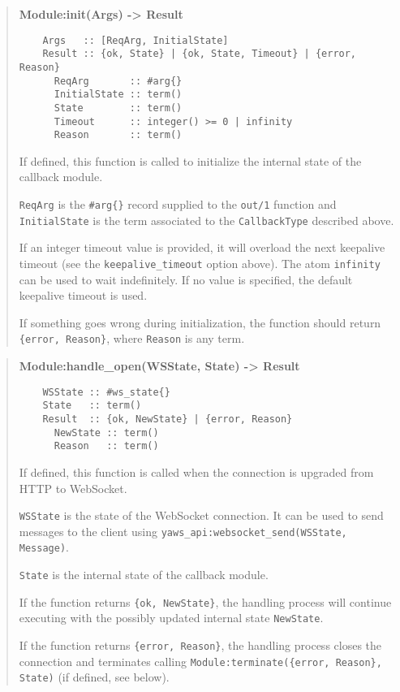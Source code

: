 \documentclass[11pt,oneside,english]{book}
\begin{document}
\begin{quote}
  \textbf{Module:init(Args) -> Result}
\begin{verbatim}
    Args   :: [ReqArg, InitialState]
    Result :: {ok, State} | {ok, State, Timeout} | {error, Reason}
      ReqArg       :: #arg{}
      InitialState :: term()
      State        :: term()
      Timeout      :: integer() >= 0 | infinity
      Reason       :: term()
\end{verbatim}

  If defined, this function is called to initialize the internal state of the
  callback module.

  \verb+ReqArg+ is the \verb+#arg{}+ record supplied to the \verb+out/1+
  function and \verb+InitialState+ is the term associated to the
  \verb+CallbackType+ described above.

  If an integer timeout value is provided, it will overload the next
  keepalive timeout (see the \verb+keepalive_timeout+ option above). The
  atom \verb+infinity+ can be used to wait indefinitely. If no value is
  specified, the default keepalive timeout is used.

  If something goes wrong during initialization, the function should return
  \verb+{error, Reason}+, where \verb+Reason+ is any term.
\end{quote}


\begin{quote}
  \textbf{Module:handle\_open(WSState, State) -> Result}
\begin{verbatim}
    WSState :: #ws_state{}
    State   :: term()
    Result  :: {ok, NewState} | {error, Reason}
      NewState :: term()
      Reason   :: term()
\end{verbatim}

  If defined, this function is called when the connection is upgraded from HTTP
  to WebSocket.

  \verb+WSState+ is the state of the WebSocket connection. It can be used
  to send messages to the client using
  \verb+yaws_api:websocket_send(WSState, Message)+.

  \verb+State+ is the internal state of the callback module.

  If the function returns \verb+{ok, NewState}+, the handling process will
  continue executing with the possibly updated internal state \verb+NewState+.

  If the function returns \verb+{error, Reason}+, the handling process closes
  the connection and terminates calling
  \verb+Module:terminate({error, Reason}, State)+ (if defined, see below).
\end{quote}
\end{document}

